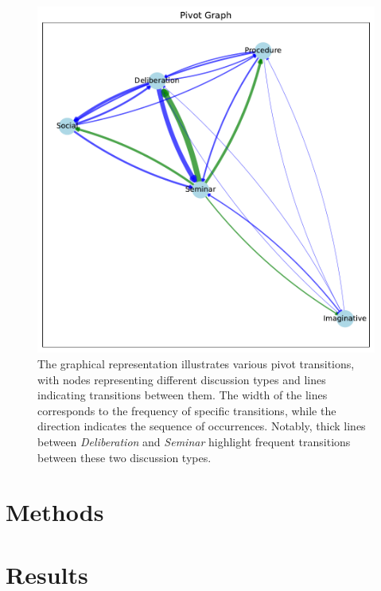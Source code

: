 \documentclass[fleqn,moreauthors,10pt]{ds_report}
\begin{document}
\begin{figure}[ht!]\centering
	\includegraphics[width=\linewidth]{fig/pivot_graph.pdf}
	\caption{The graphical representation illustrates various pivot transitions, with nodes representing different discussion types and lines indicating transitions between them. The width of the lines corresponds to the frequency of specific transitions, while the direction indicates the sequence of occurrences. Notably, thick lines between \textit{Deliberation} and \textit{Seminar} highlight frequent transitions between these two discussion types.}
	\label{fig:pivot_graph}
\end{figure}




\section*{Methods}


\section*{Results}
\end{document}

